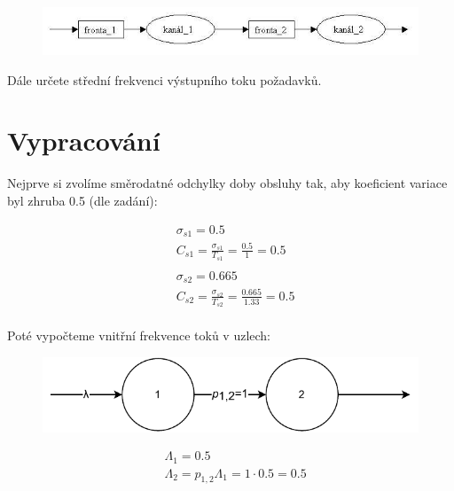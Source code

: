 \documentclass[12pt, a4paper]{article}
\let\oldsection\section
\renewcommand\section{\clearpage\oldsection}
\begin{document}
\begin{figure}[!ht]
    \centering
    \includegraphics[width=.95\linewidth]{img/assignment.jpg}
    \label{fig:}
\end{figure}

\noindent Dále určete střední frekvenci výstupního toku požadavků.

\section{Vypracování}

Nejprve si zvolíme směrodatné odchylky doby obsluhy tak, aby koeficient variace byl zhruba 0.5 (dle zadání):

\begin{equation}
    \begin{split}
    & \sigma_{s1} = 0.5 \\
    & C_{s1} =  \frac{\sigma_{s1}}{T_{s1}} = \frac{0.5}{1} = 0.5 \\
    & \\
    & \sigma_{s2} = 0.665 \\
    & C_{s2} =  \frac{\sigma_{s2}}{T_{s2}} = \frac{0.665}{1.33} = 0.5 \\
    \end{split}
\end{equation}

Poté vypočteme vnitřní frekvence toků v uzlech:

\begin{figure}[!ht]
    \centering
    \includegraphics[width=.65\linewidth]{pdf/flow-diagram.pdf}
    \label{fig:flowdiagram}
\end{figure}

\begin{equation}
    \begin{split}
    & \Lambda_{1} = 0.5 \\
    & \Lambda_{2} = p_{1,2}\Lambda_1 = 1 \cdot 0.5 = 0.5 \\
    \end{split}
\end{equation}
\end{document}

